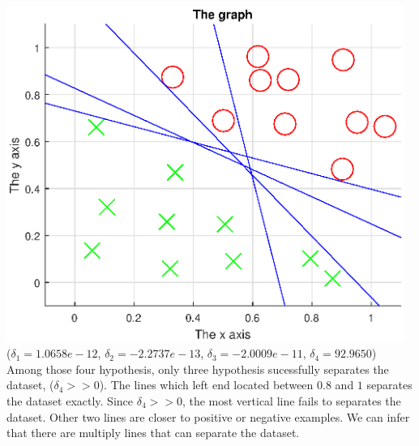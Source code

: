 \begin{enumerate}
\begin{enumerate}
\begin{enumerate}
			\includegraphics[width=13cm]{figure_2}\\
			($\delta_1=1.0658e-12$, $\delta_2=-2.2737e-13$, $\delta_3=-2.0009e-11$, $\delta_4=92.9650$)\\
			Among those four hypothesis, only three hypothesis sucessfully separates the dataset, ($\delta_4 >> 0$). The lines which left end located between $0.8$ and $1$ separates the dataset exactly. Since $\delta_4 >> 0$, the most vertical line fails to separates the dataset. Other two lines are closer to positive or negative examples. We can infer that there are multiply lines that can separate the dataset.
		\end{enumerate}
	\end{enumerate}
\end{enumerate}



